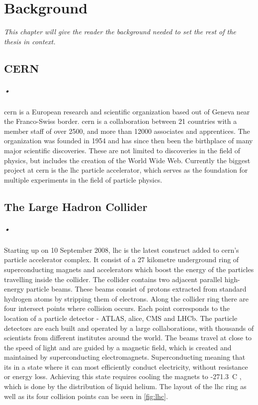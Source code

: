 \documentclass[a4paper]{report}
\begin{document}
\chapter{Background}
\textit{This chapter will give the reader the background needed to set the rest of the thesis in context.}

\section{CERN}
\paragraph{•}
\gls{cern} is a European research and scientific organization based out of Geneva near the Franco-Swiss border.\cite{cern}
\gls{cern} is a collaboration between 21 countries with a member staff of over 2500, and more than 12000 associates and apprentices.
The organization was founded in 1954 and has since then been the birthplace of many major scientific discoveries.
These are not limited to discoveries in the field of physics, but includes the creation of the World Wide Web.\cite{www}
Currently the biggest project at \gls{cern} is the \gls{lhc} particle accelerator, which serves as the foundation for multiple experiments in the field of particle physics.

\section{The Large Hadron Collider}
\label{sec:lhc}
\paragraph{•}
Starting up on 10 September 2008, \gls{lhc} is the latest construct added to \gls{cern}'s particle accelerator complex.\cite{lhc}
It consist of a 27 kilometre underground ring of superconducting magnets and accelerators which boost the energy of the particles travelling inside the collider.
The collider contains two adjacent parallel high-energy particle beams.
These beams consist of protons extracted from standard hydrogen atoms by stripping them of electrons.
Along the collider ring there are four intersect points where collision occurs.
Each point corresponds to the location of a particle detector - ATLAS, \gls{alice}, CMS and LHCb.
The particle detectors are each built and operated by a large collaborations, with thousands of scientists from different institutes around the world.
The beams travel at close to the speed of light and are guided by a magnetic field, which is created and maintained by superconducting electromagnets.
Superconducting meaning that its in a state where it can most efficiently conduct electricity, without resistance or energy loss.
Achieving this state requires cooling the magnets to -271.3\degree~C , which is done by the distribution of liquid helium.
The layout of the \gls{lhc} ring as well as its four collision points can be seen in \ref{fig:lhc}.
\end{document}
